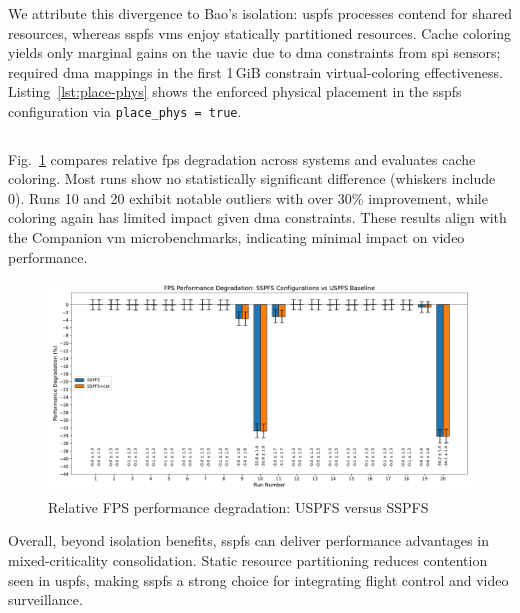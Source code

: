 We attribute this divergence to Bao’s isolation: \gls{uspfs} processes contend
for shared resources, whereas \gls{sspfs} \glspl{vm} enjoy statically
partitioned resources. Cache coloring yields only marginal gains on the
\gls{uavic} due to \gls{dma} constraints from \gls{spi} sensors; required
\gls{dma} mappings in the first 1\,GiB constrain virtual-coloring
effectiveness. Listing~\ref{lst:place-phys} shows the enforced physical
placement in the \gls{sspfs} configuration via \lstinline[keepspaces=true]|place_phys = true|.

\begin{longlisting}
\centering
\inputminted[]{bash}{./listing/placePhys.c}
\caption[Physical memory mapping in the SSPFS system]{Physical memory mapping in \gls{sspfs}: \lstinline[keepspaces=true]|place_phys = true|}
\label{lst:place-phys}
\end{longlisting}

Fig.~\ref{fig:cam-sspfs-uspfs} compares relative \gls{fps} degradation across
systems and evaluates cache coloring. Most runs show no statistically
significant difference (whiskers include 0). Runs 10 and 20 exhibit notable
outliers with over 30\% improvement, while coloring again has limited impact
given \gls{dma} constraints. These results align with the Companion \gls{vm}
microbenchmarks, indicating minimal impact on video performance.

\begin{figure}[!hbt]
  \centering
  \includegraphics[width=1.0\textwidth]{./img/pdf/cam-sspfs-uspfs} 
  \caption{Relative FPS performance degradation: USPFS versus SSPFS}%
  \label{fig:cam-sspfs-uspfs}
\end{figure}

Overall, beyond isolation benefits, \gls{sspfs} can deliver performance
advantages in mixed-criticality consolidation. Static resource partitioning
reduces contention seen in \gls{uspfs}, making \gls{sspfs} a strong choice for
integrating flight control and video surveillance.

